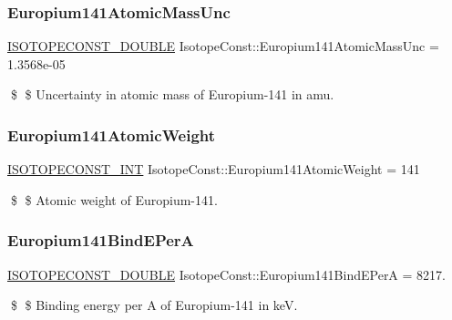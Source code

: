 \subsubsection{\texorpdfstring{Europium141\+Atomic\+Mass\+Unc}{Europium141AtomicMassUnc}}
{\footnotesize\ttfamily \mbox{\hyperlink{group___isotope_const-_macros_ga8f45a7272ce02c0b4c65c44636ed719a}{I\+S\+O\+T\+O\+P\+E\+C\+O\+N\+S\+T\+\_\+\+D\+O\+U\+B\+LE}} Isotope\+Const\+::\+Europium141\+Atomic\+Mass\+Unc = 1.\+3568e-\/05}

\$ \$ Uncertainty in atomic mass of Europium-\/141 in amu. \mbox{\label{group___isotope_const-_europium-_eu141_ga4c48d781e7564b6ac93c6182ee6beaaa}} 
\subsubsection{\texorpdfstring{Europium141\+Atomic\+Weight}{Europium141AtomicWeight}}
{\footnotesize\ttfamily \mbox{\hyperlink{group___isotope_const-_macros_ga5f18360b3e99483a35c32d789e62621c}{I\+S\+O\+T\+O\+P\+E\+C\+O\+N\+S\+T\+\_\+\+I\+NT}} Isotope\+Const\+::\+Europium141\+Atomic\+Weight = 141}

\$ \$ Atomic weight of Europium-\/141. \mbox{\label{group___isotope_const-_europium-_eu141_gaf16ed64d1ff9da82f157b37970116143}} 
\subsubsection{\texorpdfstring{Europium141\+Bind\+E\+PerA}{Europium141BindEPerA}}
{\footnotesize\ttfamily \mbox{\hyperlink{group___isotope_const-_macros_ga8f45a7272ce02c0b4c65c44636ed719a}{I\+S\+O\+T\+O\+P\+E\+C\+O\+N\+S\+T\+\_\+\+D\+O\+U\+B\+LE}} Isotope\+Const\+::\+Europium141\+Bind\+E\+PerA = 8217.}

\$ \$ Binding energy per A of Europium-\/141 in keV. \mbox{\label{group___isotope_const-_europium-_eu141_gae3d436061d58937c6cb4c250e9cbbe11}} 
